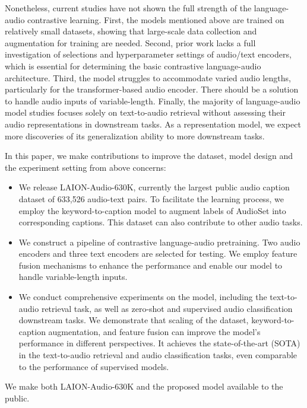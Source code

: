 Nonetheless, current studies have not shown the full strength of the language-audio contrastive learning.
First, the models mentioned above are trained on relatively small datasets, showing that large-scale data collection and augmentation for training are needed. Second, prior work lacks a full investigation of selections and hyperparameter settings of audio/text encoders, which is essential for determining the basic contrastive language-audio architecture.
Third, the model struggles to accommodate varied audio lengths, particularly for the transformer-based audio encoder.
There should be a solution to handle audio inputs of variable-length.
Finally, the majority of language-audio model studies focuses solely on text-to-audio retrieval without assessing their audio representations in downstream tasks. As a representation model, we expect more discoveries of its generalization ability to more downstream tasks.

In this paper, we make contributions to improve the dataset, model design and the experiment setting from above concerns:
\begin{itemize}[leftmargin=*]
    \item We release LAION-Audio-630K, currently the largest public audio caption dataset of 633,526 audio-text pairs. To facilitate the learning process, we employ the keyword-to-caption model to augment labels of AudioSet \cite{audioset} into corresponding captions. This dataset can also contribute to other audio tasks.  
    
    \item We construct a pipeline of contrastive language-audio pretraining. Two audio encoders and three text encoders are selected for testing. We employ feature fusion mechanisms to enhance the performance and enable our model to handle variable-length inputs.

    \item We conduct comprehensive experiments on the model, including the text-to-audio retrieval task, as well as zero-shot and supervised audio classification downstream tasks. We demonstrate that scaling of the dataset, keyword-to-caption augmentation, and feature fusion can improve the model's performance in different perspectives. It achieves the state-of-the-art (SOTA) in the text-to-audio retrieval and audio classification tasks, even comparable to the performance of supervised models.
\end{itemize}
We make both LAION-Audio-630K and the proposed model available to the public.

